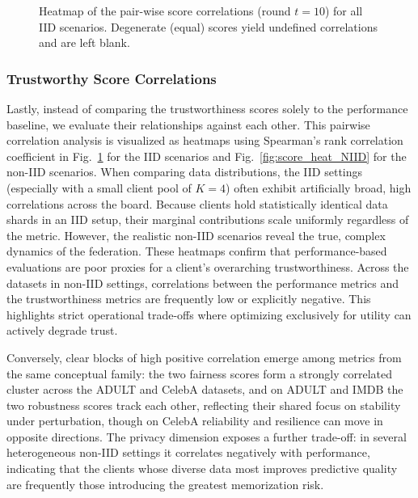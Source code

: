 \documentclass[acmsmall]{acmart}
\begin{document}
\begin{figure}[!b]
    \caption{Heatmap of the pair-wise score correlations (round $t=10$) for all IID scenarios. Degenerate (equal) scores yield undefined correlations and are left blank.}
    \label{fig:score_heat_IID}
\end{figure}

\subsubsection*{Trustworthy Score Correlations}

Lastly, instead of comparing the trustworthiness scores solely to the performance baseline, we evaluate their relationships against each other. This pairwise correlation analysis is visualized as heatmaps using Spearman's rank correlation coefficient in Fig.~\ref{fig:score_heat_IID} for the IID scenarios and Fig.~\ref{fig:score_heat_NIID} for the non-IID scenarios. When comparing data distributions, the IID settings (especially with a small client pool of $K=4$) often exhibit artificially broad, high correlations across the board. Because clients hold statistically identical data shards in an IID setup, their marginal contributions scale uniformly regardless of the metric. However, the realistic non-IID scenarios reveal the true, complex dynamics of the federation. These heatmaps confirm that performance-based evaluations are poor proxies for a client's overarching trustworthiness. Across the datasets in non-IID settings, correlations between the performance metrics and the trustworthiness metrics are frequently low or explicitly negative. This highlights strict operational trade-offs where optimizing exclusively for utility can actively degrade trust.

Conversely, clear blocks of high positive correlation emerge among metrics from the same conceptual family: the two fairness scores form a strongly correlated cluster across the ADULT and CelebA datasets, and on ADULT and IMDB the two robustness scores track each other, reflecting their shared focus on stability under perturbation, though on CelebA reliability and resilience can move in opposite directions. The privacy dimension exposes a further trade-off: in several heterogeneous non-IID settings it correlates negatively with performance, indicating that the clients whose diverse data most improves predictive quality are frequently those introducing the greatest memorization risk.
\end{document}
